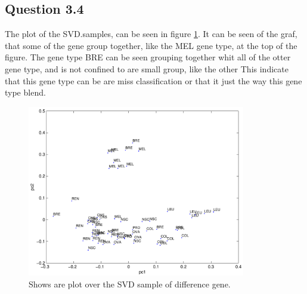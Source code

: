 \subsection*{Question 3.4}
The plot of the SVD.samples, can be seen in figure \ref{fig:q34}. It can be seen of the graf, that some of the gene group together, like the MEL gene type, at the top of the figure. The gene type BRE can be seen grouping together whit all of the otter gene type, and is not confined to are small group, like the other This indicate that this gene type can be are miss classification or that it just the way this gene type blend.
\begin{figure}[!htbp]
  \centering
  \includegraphics[width=0.85\textwidth]{./images/q34cancer}
  \caption{Shows are plot over the SVD sample of difference gene.}
  \label{fig:q34}
\end{figure}

